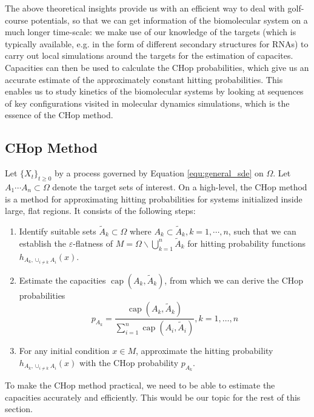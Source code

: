 \documentclass[english, aip, jcp, priprint, graphicx,floatfix]{revtex4-1}
\theoremstyle{plain}
\theoremstyle{definition}
\theoremstyle{plain}
\begin{document}
The above theoretical insights provide us with an efficient way to deal with golf-course potentials, so that we can get information of the biomolecular system on a much longer time-scale: we make use of our knowledge of the targets (which is typically available, e.g. in the form of different secondary structures for RNAs) to carry out local simulations around the targets for the estimation of capacites. Capacities can then be used to calculate the CHop probabilities, which give us an accurate estimate of the approximately constant hitting probabilities. This enables us to study kinetics of the biomolecular systems by looking at sequences of key configurations visited in molecular dynamics simulations, which is the essence of the CHop method.

\subsection{CHop Method}

Let $\{X_t\}_{t \geq 0}$ by a process governed by Equation \ref{equ:general_sde} on $\Omega$.  Let $A_1\cdots A_n \subset \Omega$ denote the target sets of interest.  On a high-level, the CHop method is a method for approximating hitting probabilities for systems initialized inside large, flat regions.  It consists of the following steps:

\begin{enumerate}
    \item Identify suitable sets $\tilde A_k \subset \Omega$ where $A_k \subset \tilde{A}_k, k=1, \cdots, n$, such that we can establish the $\varepsilon$-flatness of $M = \Omega \backslash \bigcup_{k = 1}^n \tilde{A}_k $ for hitting probability functions $h_{A_k,\cup_{i\neq k} A_i}(x)$.
    \item Estimate the capacities $\ensuremath{\operatorname{cap}} (A_k, \tilde{A}_k)$, from which we can derive the CHop probabilities
\begin{equation*}
p_{A_k} = \frac{\ensuremath{\operatorname{cap}} (A_k, \tilde{A}_k)}{\sum_{i = 1}^n \ensuremath{\operatorname{cap}} (A_i, \tilde{A}_i)}, k=1,\dots, n
\end{equation*} 
    \item For any initial condition $x \in M$, approximate the hitting probability $h_{A_k,\cup_{i\neq k} A_i}(x)$ with the CHop probability $p_{A_k}$.  
\end{enumerate}

To make the CHop method practical, we need to be able to estimate the capacities accurately and efficiently. This would be our topic for the rest of this section.
\end{document}
